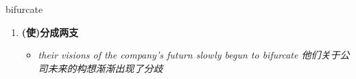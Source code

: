 
\begin{frame}
{\huge bifurcate}
\begin{center}
\begin{enumerate}\Large
  \item \textbf{(使)分成两支}
  \begin{itemize}
    \item \em{\Large{their visions of the company's futurn slowly begun to bifurcate 他们关于公司未来的构想渐渐出现了分歧}}
  \end{itemize}
\end{enumerate}
\end{center}
\end{frame}
